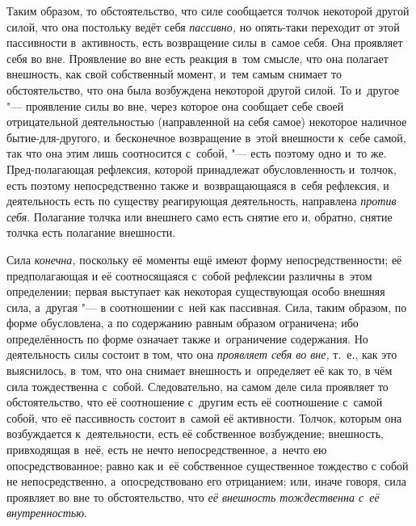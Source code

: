 Таким образом, то обстоятельство, что силе сообщается толчок некоторой
другой силой, что она постольку ведёт себя
{\em пассивно,} но опять-таки переходит от этой
пассивности в~активность, есть возвращение силы в~самое себя. Она проявляет
себя во вне. Проявление во вне есть реакция в~том смысле, что она полагает
внешность, как свой собственный момент, и~тем самым снимает то
обстоятельство, что она была возбуждена некоторой другой силой. То и~другое
"--- проявление силы во вне, через которое она сообщает себе своей
отрицательной деятельностью (направленной на себя самое) некоторое наличное
бытие-для-другого, и~бесконечное возвращение в~этой внешности к~себе самой,
так что она этим лишь соотносится с~собой, "--- есть поэтому одно и~то же.
Пред-полагающая рефлексия, которой принадлежат обусловленность и~толчок,
есть поэтому непосредственно также и~возвращающаяся в~себя рефлексия, и
деятельность есть по существу реагирующая деятельность, направлена
{\em против себя}. Полагание толчка или внешнего само
есть снятие его и, обратно, снятие толчка есть полагание внешности.



Сила {\em конечна,}
поскольку её моменты ещё имеют форму непосредственности; её предполагающая
и её соотносящаяся с~собой рефлексии различны в~этом определении; первая
выступает как некоторая существующая особо внешняя сила, а~другая "--- в
соотношении с~ней как пассивная. Сила, таким образом, по форме обусловлена,
а по содержанию равным образом ограничена; ибо определённость по форме
означает также и~ограничение содержания. Но деятельность силы состоит в
том, что она {\em проявляет себя во вне,} т.~е., как
это выяснилось, в~том, что она снимает внешность и~определяет её как то, в
чём сила тождественна с~собой. Следовательно, на самом деле сила проявляет
то обстоятельство, что её соотношение с~другим есть её соотношение с~самой
собой, что её пассивность состоит в~самой её активности. Толчок, которым
она возбуждается к~деятельности, есть её собственное возбуждение;
внешность, привходящая в~неё, есть не нечто непосредственное, а~нечто ею
опосредствованное; равно как и~её собственное существенное тождество с
собой не непосредственно, а~опосредствовано его отрицанием; или, иначе
говоря, сила проявляет во вне то обстоятельство, что
{\em её внешность тождественна с~её внутренностью}.


